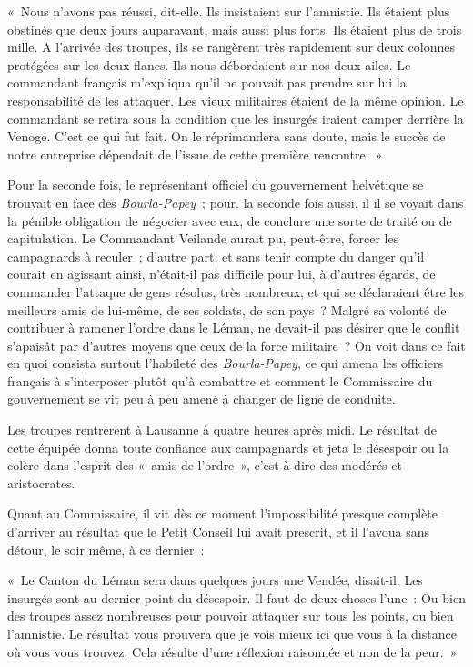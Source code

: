 \documentclass[french,twoside]{book} %
\newenvironment{quoteblock}%
  {\begin{quoting}}
  {\end{quoting}}
\newenvironment{quotebar}{%
    \def\FrameCommand{{\color{rubric!10!}\vrule width 0.5em} \hspace{0.9em}}%
    \def\OuterFrameSep{\itemsep} %
    \MakeFramed {\advance\hsize-\width \FrameRestore}
  }%
  {%
    \endMakeFramed
  }
\renewenvironment{quoteblock}%
  {%
    \savenotes
    \setstretch{0.9}
    \normalfont
    \begin{quotebar}
  }
  {%
    \end{quotebar}
    \spewnotes
  }
\begin{document}
\begin{quoteblock}
 \noindent « Nous n’avons pas réussi, dit-elle. Ils insistaient sur l’amnistie. Ils étaient plus obstinés que deux jours auparavant, mais aussi plus forts. Ils étaient plus de trois mille. A l’arrivée des troupes, ils se rangèrent très rapidement sur deux colonnes protégées sur les deux flancs. Ils nous débordaient sur nos deux ailes. Le commandant français m’expliqua qu’il ne pouvait pas prendre sur lui la responsabilité de les attaquer. Les vieux militaires étaient de la même opinion. Le commandant se retira sous la condition que les insurgés iraient camper derrière la Venoge. C’est ce qui fut fait. On le réprimandera sans doute, mais le succès de notre entreprise dépendait de l’issue de cette première rencontre. »
 \end{quoteblock}

\noindent Pour la seconde fois, le représentant officiel du gouvernement helvétique se trouvait en face des \emph{Bourla-Papey} ; pour. la seconde fois aussi, il il se voyait dans la pénible obligation de négocier avec eux, de conclure une sorte de traité ou de capitulation. Le Commandant Veilande aurait pu, peut-être, forcer les campagnards à reculer ; d’autre part, et sans tenir compte du danger qu’il courait en agissant ainsi, n’était-il pas difficile pour lui, à d’autres égards, de commander l’attaque de gens résolus, très nombreux, et qui se déclaraient être les meilleurs amis de lui-même, de ses soldats, de son pays ? Malgré sa volonté de contribuer à ramener l’ordre dans le Léman, ne devait-il pas désirer que le conflit s’apaisât par d’autres moyens que ceux de la force militaire ? On voit dans ce fait en quoi consista surtout l’habileté des \emph{Bourla-Papey}, ce qui amena les officiers français à s’interposer plutôt qu’à combattre et comment le Commissaire du gouvernement se vit peu à peu amené à changer de ligne de conduite.\par
Les troupes rentrèrent à Lausanne à quatre heures après midi. Le résultat de cette équipée donna toute confiance aux campagnards et jeta le désespoir ou la colère dans l’esprit des « amis de l’ordre », c’est-à-dire des modérés et aristocrates.\par
Quant au Commissaire, il vit dès ce moment l’impossibilité presque complète d’arriver au résultat que le Petit Conseil lui avait prescrit, et il l’avoua sans détour, le soir même, à ce dernier :\par

\begin{quoteblock}
 \noindent « Le Canton du Léman sera dans quelques jours une Vendée, disait-il. Les insurgés sont au dernier point du désespoir. Il faut de deux choses l’une : Ou bien des troupes assez nombreuses pour pouvoir attaquer sur tous les points, ou bien l’amnistie. Le résultat vous prouvera que je vois mieux ici que vous à la distance où vous vous trouvez. Cela résulte d’une réflexion raisonnée et non de la peur. »
 \end{quoteblock}
\end{document}
